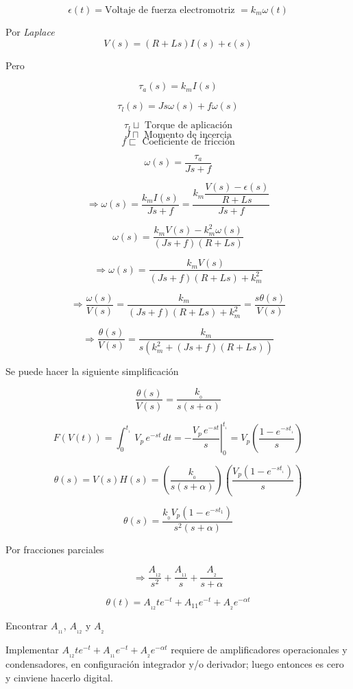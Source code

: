 $$\epsilon(t) = \mbox{Voltaje de fuerza electromotriz } = k_{m}\omega(t)$$ 

Por \textit{Laplace}
$$V(s) = (R + Ls)I(s) + \epsilon(s)$$

Pero

$$\tau_{a}(s) = k_{m}I(s)$$

$$\tau_{l}(s) = Js\omega(s) + f\omega (s)$$

$$\tau_{l} \sqcup \mbox{ Torque de aplicación}$$
$$J \sqcap \mbox{ Momento de incercia}$$
$$f \sqsubset \mbox{ Coeficiente de fricción}$$


$$\omega(s) = \dfrac{\tau_{a}}{Js + f}$$

$$\Rightarrow \omega(s) = \dfrac{k_{m}I(s)}{Js + f} = \dfrac{k_{m} \dfrac{V(s) - \epsilon (s)}{R + Ls}}{Js + f}$$

$$\omega(s) = \dfrac{k_{m} V(s) - k_{m}^{2}\omega(s)}{(Js + f)(R + Ls)}$$

$$\Rightarrow \omega(s) = \dfrac{k_{m}V(s)}{(Js + f)(R + Ls) + k_{m}^{2}}$$

$$\Rightarrow \dfrac{\omega(s)}{V(s)} = \dfrac{k_{m}}{(Js + f)(R + Ls) + k_{m}^{2}} = \dfrac{s\theta(s)}{V(s)}$$

$$\Rightarrow \dfrac{\theta(s)}{V(s)} = \dfrac{k_{m}}{s(k_{m}^{2} + (Js + f)(R + Ls))}$$

Se puede hacer la siguiente simplificación

$$\dfrac{\theta(s)}{V(s)} = \dfrac{k_{_{0}}}{s(s + \alpha)}$$


$$F(V(t)) = \displaystyle \int_{0}^{t_{_{1}}}\, V_{p}\,e^{-st}\, dt = \left. - \dfrac{V_{p}\,e^{-st}}{s} \right|_{0}^{t_{_{1}}} = V_{p} \left( \dfrac{1 - e^{-st_{_{1}}}}{s} \right) $$

$$\theta(s) = V(s)H(s) = \left( \dfrac{k_{_{0}}}{s(s + \alpha)} \right) \left( \dfrac{V_{p}(1 - e^{-st_{_{1}}})}{s} \right)  $$

$$\theta(s) = \dfrac{k_{_{0}}V_{p}(1 - e^{-st_{1}})}{s^2(s + \alpha)}$$

Por fracciones parciales

$$\Rightarrow \dfrac{A_{_{12}}}{s^2} + \dfrac{A_{_{11}}}{s} + \dfrac{A_{_{2}}}{s + \alpha}$$

$$\theta(t) = A_{_{12}} te^{-t} + A_{11}e^{-t} + A_{_{2}}e^{-\alpha t}$$

Encontrar $A_{_{11}}$, $A_{_{12}}$ y $A_{_{2}}$


Implementar $A_{_12}te^{-t} + A_{_{11}}e^{-t} + A_{_{2}}e^{-\alpha t}$ requiere de amplificadores operacionales y condensadores, en configuración integrador y/o derivador; luego entonces es cero y cinviene hacerlo digital.



